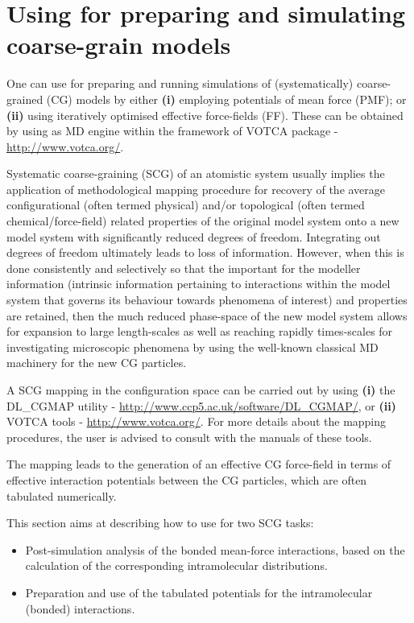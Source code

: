 \section{Using \D for preparing and simulating coarse-grain models}
\label{cg-intro}

One can use \D for preparing and running simulations of
(systematically) coarse-grained (CG) models by either
{\bf (i)} employing potentials of mean force (PMF); or
{\bf (ii)} using iteratively optimised effective force-fields
(FF).  These can be obtained by using \D as MD engine within
the framework of VOTCA package -
\href{http://www.votca.org/}{http://www.votca.org/}.

Systematic coarse-graining (SCG) of an atomistic system
usually implies the application of methodological mapping
procedure for recovery of the average configurational
(often termed physical) and/or topological (often termed
chemical/force-field) related properties of the original
model system onto a new model system with significantly
reduced degrees of freedom.  Integrating out degrees of
freedom ultimately leads to loss of information.  However,
when this is done consistently and selectively so that
the important for the modeller information (intrinsic
information pertaining to interactions within the model
system that governs its behaviour towards phenomena of interest)
and properties are retained, then the much reduced
phase-space of the new model system allows for expansion to
large length-scales as well as reaching rapidly times-scales
for investigating microscopic phenomena by using the well-known
classical MD machinery for the new CG particles.

A SCG mapping in the configuration space can be carried out
by using {\bf (i)} the DL\_CGMAP utility -
\href{http://www.ccp5.ac.uk/software/DL\_CGMAP/}{http://www.ccp5.ac.uk/software/DL\_CGMAP/},
or {\bf (ii)}  VOTCA tools -
\href{http://www.votca.org/}{http://www.votca.org/}.
For more details about the mapping procedures, the user is
advised to consult with the manuals of these tools.

The mapping leads to the generation of an effective CG
force-field in terms of effective interaction potentials
between the CG particles, which are often tabulated numerically.

This section aims at describing how to use \D for two SCG tasks:

\begin{itemize}
\item Post-simulation analysis of the bonded mean-force
interactions, based on the calculation of the corresponding
intramolecular distributions.
\item Preparation and use of the tabulated potentials for the
intramolecular (bonded) interactions.
\end{itemize}

